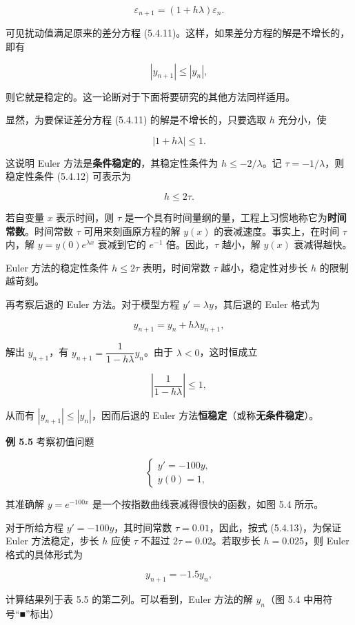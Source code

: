 \documentclass[
  10pt,
  fontset=fandol]{ctexart}
\begin{document}
\[
\varepsilon_{n+1}=(1+h\lambda)\varepsilon_n.
\]

可见扰动值满足原来的差分方程 (5.4.11)。这样，如果差分方程的解是不增长的，即有

\[
|y_{n+1}|\leqslant|y_n|,
\]

则它就是稳定的。这一论断对于下面将要研究的其他方法同样适用。

显然，为要保证差分方程 (5.4.11) 的解是不增长的，只要选取 \(h\) 充分小，使

\[
|1+h\lambda|\leqslant1.\tag{5.4.12}
\]

这说明 Euler 方法是\textbf{条件稳定的}，其稳定性条件为 \(h\leqslant-2/\lambda\)。记 \(\tau=-1/\lambda\)，则稳定性条件 (5.4.12) 可表示为

\[
h\leqslant2\tau.\tag{5.4.13}
\]

若自变量 \(x\) 表示时间，则 \(\tau\) 是一个具有时间量纲的量，工程上习惯地称它为\textbf{时间常数}。时间常数 \(\tau\) 可用来刻画原方程的解 \(y(x)\) 的衰减速度。事实上，在时间 \(\tau\) 内，解 \(y=y(0)e^{\lambda x}\) 衰减到它的 \(e^{-1}\) 倍。因此，\(\tau\) 越小，解 \(y(x)\) 衰减得越快。

Euler 方法的稳定性条件 \(h\leqslant2\tau\) 表明，时间常数 \(\tau\) 越小，稳定性对步长 \(h\) 的限制越苛刻。

再考察后退的 Euler 方法。对于模型方程 \(y'=\lambda y\)，其后退的 Euler 格式为

\[
y_{n+1}=y_n+h\lambda y_{n+1},
\]

解出 \(y_{n+1}\)，有 \(y_{n+1}=\dfrac{1}{1-h\lambda}y_n\)。由于 \(\lambda<0\)，这时恒成立

\[
\left|\frac{1}{1-h\lambda}\right|\leqslant1,
\]

从而有 \(|y_{n+1}|\leqslant|y_n|\)，因而后退的 Euler 方法\textbf{恒稳定}（或称\textbf{无条件稳定}）。

\textbf{例 5.5} 考察初值问题

\[
\begin{cases}
y'=-100y,\\
y(0)=1,
\end{cases}
\]

其准确解 \(y=e^{-100x}\) 是一个按指数曲线衰减得很快的函数，如图 5.4 所示。

对于所给方程 \(y'=-100y\)，其时间常数 \(\tau=0.01\)，因此，按式 (5.4.13)，为保证 Euler 方法稳定，步长 \(h\) 应使 \(\tau\) 不超过 \(2\tau=0.02\)。若取步长 \(h=0.025\)，则 Euler 格式的具体形式为

\[
y_{n+1}=-1.5y_n,
\]

计算结果列于表 5.5 的第二列。可以看到，Euler 方法的解 \(y_n\)（图 5.4 中用符号``■''标出）
\end{document}
